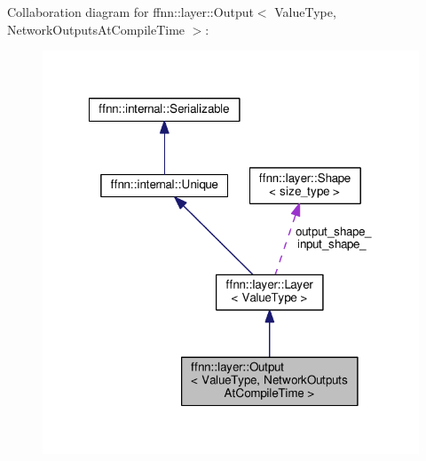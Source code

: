 Collaboration diagram for ffnn\-:\-:layer\-:\-:Output$<$ Value\-Type, Network\-Outputs\-At\-Compile\-Time $>$\-:\nopagebreak
\begin{figure}[H]
\begin{center}
\leavevmode
\includegraphics[width=318pt]{classffnn_1_1layer_1_1_output__coll__graph}
\end{center}
\end{figure}
